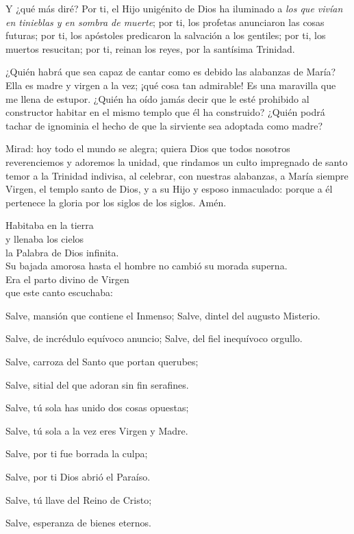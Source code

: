 \documentclass[]{article}
\begin{document}
Y ¿qué más diré? Por ti, el Hijo unigénito de Dios ha iluminado a
\emph{los que vivían en tinieblas y en sombra de muerte}; por ti, los
profetas anunciaron las cosas futuras; por ti, los apóstoles predicaron
la salvación a los gentiles; por ti, los muertos resucitan; por ti,
reinan los reyes, por la santísima Trinidad.

¿Quién habrá que sea capaz de cantar como es debido las alabanzas de
María? Ella es madre y virgen a la vez; ¡qué cosa tan admirable! Es una
maravilla que me llena de estupor. ¿Quién ha oído jamás decir que le
esté prohibido al constructor habitar en el mismo templo que él ha
construido? ¿Quién podrá tachar de ignominia el hecho de que la
sirviente sea adoptada como madre?

Mirad: hoy todo el mundo se alegra; quiera Dios que todos nosotros
reverenciemos y adoremos la unidad, que rindamos un culto impregnado de
santo temor a la Trinidad indivisa, al celebrar, con nuestras alabanzas,
a María siempre Virgen, el templo santo de Dios, y a su Hijo y esposo
inmaculado: porque a él pertenece la gloria por los siglos de los
siglos. Amén.

\protect\hypertarget{_Toc448662836}{}{\protect\hypertarget{_Toc448690355}{}{}}

Habitaba en la tierra\\
y llenaba los cielos\\
la Palabra de Dios infinita.\\
Su bajada amorosa hasta el hombre no cambió su morada superna.\\
Era el parto divino de Virgen\\
que este canto escuchaba:

Salve, mansión que contiene el Inmenso; Salve, dintel del augusto
Misterio.

Salve, de incrédulo equívoco anuncio; Salve, del fiel inequívoco
orgullo.

Salve, carroza del Santo que portan querubes;

Salve, sitial del que adoran sin fin serafines.

Salve, tú sola has unido dos cosas opuestas;

Salve, tú sola a la vez eres Virgen y Madre.

Salve, por ti fue borrada la culpa;

Salve, por ti Dios abrió el Paraíso.

Salve, tú llave del Reino de Cristo;

Salve, esperanza de bienes eternos.
\end{document}
